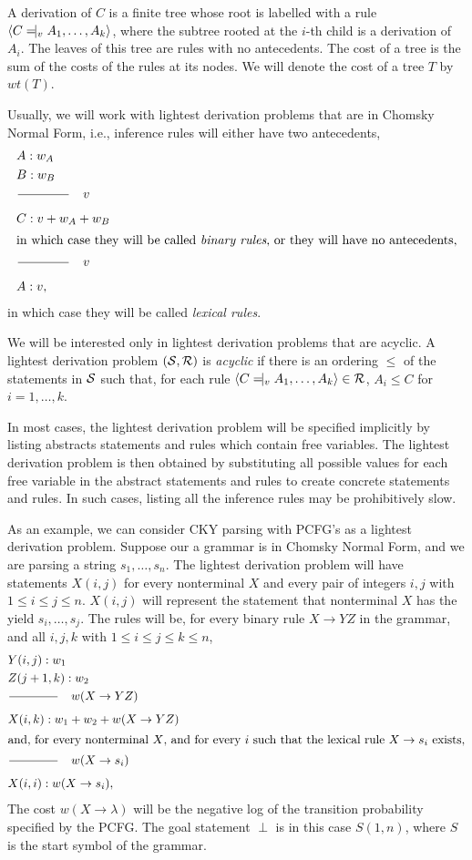 A derivation of $C$ is a finite tree whose root is labelled with a
rule $ \langle C\tne_v A_1, \dots, A_k \rangle$, where the subtree
rooted at the $i$-th child is a derivation of $A_i$. The leaves of
this tree are rules with no antecedents. The cost of a tree is the sum
of the costs of the rules at its nodes. We will denote the cost of a
tree $T$ by $wt(T)$.

Usually, we will work with lightest derivation problems that are in
Chomsky Normal Form, i.e., inference rules will either have two
antecedents,
\begin{align*}
  &A : w_A\\
  &B : w_B\\
  &\frac{\qquad \qquad}{\qquad\qquad}\quad v\\
  &C : v + w_A + w_B \\
  \intertext{in which case they will be called {\em binary rules}, or
    they will have no antecedents,}
  &\frac{\qquad \qquad}{\qquad\qquad}\quad v\\
  &A : v,
\end{align*}
in which case they will be called {\em lexical rules}.

We will be interested only in lightest derivation problems that are
acyclic. A lightest derivation problem $({\mathcal S},{\mathcal R})$ is {\em acyclic}
if there is an ordering $\le$ of the statements in ${\mathcal S}$ such that,
for each rule $\langle C\tne_v A_1,\dots, A_k \rangle \in \RRR$, $A_i
\le C$ for $i=1,\dots, k$.

In most cases, the lightest derivation problem will be specified
implicitly by listing abstracts statements and rules which contain
free variables. The lightest derivation problem is then obtained by
substituting all possible values for each free variable in the
abstract statements and rules to create concrete statements and
rules. In such cases, listing all the inference rules may be
prohibitively slow.

As an example, we can consider CKY parsing with PCFG's as a lightest
derivation problem. Suppose our a grammar is in Chomsky Normal Form,
and we are parsing a string $s_1, \dots, s_n$. The lightest derivation
problem will have statements $X(i,j)$ for every nonterminal $X$ and
every pair of integers $i,j$ with $1\le i \le j \le n$. $X(i,j)$ will
represent the statement that nonterminal $X$ has the yield $s_i,\dots,
s_j$. The rules will be, for every binary rule $X\to YZ$ in the
grammar, and all $i,j,k$ with $1\le i \le j \le k \le n$,
\begin{align*}
&Y(i,j) : w_1\\
&Z(j+1,k) : w_2\\
&\frac{\qquad \qquad}{\qquad\qquad}\quad w(X \to YZ)\\
&X(i,k) : w_1 + w_2 + w(X \to YZ) \\
\intertext{and, for every nonterminal $X$, and for every $i$ such that the lexical rule $X\to s_i$ exists,}
&\frac{\qquad \qquad}{\qquad\qquad}\quad w(X\to s_i)\\
&X(i,i) : w(X\to s_i),
\end{align*}
The cost $w(X \to \lambda)$ will be the negative log of the transition
probability specified by the PCFG. The goal statement $\perp$ is in
this case $S(1,n)$, where $S$ is the start symbol of the grammar.

